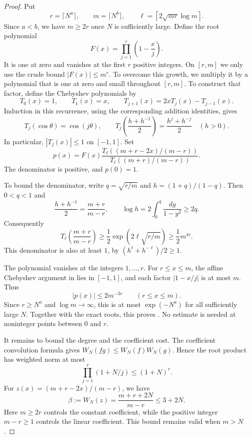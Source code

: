 \begin{proof}
Put
\[
  r=\lceil N^a\rceil,
  \qquad m=\lceil N^b\rceil,
  \qquad \ell=\left\lceil 2\sqrt{mr}\log m\right\rceil.
\]
Since $a<b$, we have $m\ge2r$ once $N$ is sufficiently large.  Define the
root polynomial
\[
 F(x)=\prod_{j=1}^{r}\left(1-\frac{x}{j}\right).
\]
It is one at zero and vanishes at the first $r$ positive integers.
On $[r,m]$ we only use the crude bound $|F(x)|\le m^r$.
To overcome this growth, we multiply it by a
polynomial that is one at zero and small throughout $[r,m]$.
To construct that factor, define the
Chebyshev polynomials by
\[
  T_0(x)=1,\qquad T_1(x)=x,\qquad
  T_{j+1}(x)=2xT_j(x)-T_{j-1}(x).
\]
Induction in this recurrence, using the corresponding addition identities,
gives
\[
  T_j(\cos\theta)=\cos(j\theta),
  \qquad
  T_j\!\left(\frac{h+h^{-1}}2\right)
    =\frac{h^j+h^{-j}}2\quad(h>0).
\]
In particular, $|T_j(x)|\le1$ on $[-1,1]$.  Set
\begin{equation}\label{eq:polynomial-construction}
  p(x)=F(x)
       \frac{T_\ell\!\left((m+r-2x)/(m-r)\right)}
            {T_\ell\!\left((m+r)/(m-r)\right)}.
\end{equation}
The denominator is positive, and $p(0)=1$.

To bound the denominator, write $q=\sqrt{r/m}$ and
$h=(1+q)/(1-q)$.  Then $0<q<1$ and
\[
  \frac{h+h^{-1}}2=\frac{m+r}{m-r},
  \qquad
  \log h=2\int_0^q\frac{dy}{1-y^2}\ge2q.
\]
Consequently
\[
  T_\ell\!\left(\frac{m+r}{m-r}\right)
    \ge \frac12\exp\!\left(2\ell\sqrt{r/m}\right)
    \ge \frac12 m^{4r}.
\]
This denominator is also at least $1$, by
$(h^\ell+h^{-\ell})/2\ge1$.

The polynomial vanishes at the integers $1,\ldots,r$.  For $r\le x\le m$,
the affine Chebyshev argument in  lies in
$[-1,1]$, and each factor $|1-x/j|$ is at most $m$.  Thus
\[
  |p(x)|\le 2m^{-3r}\qquad(r\le x\le m).
\]
Since $r\ge N^a$ and $\log m\longrightarrow\infty$, this is at most
$\exp(-N^a)$ for all sufficiently large $N$.  Together with the exact roots,
this proves .  No estimate is needed at noninteger
points between $0$ and $r$.

It remains to bound the degree and the coefficient cost.
The coefficient convolution formula gives
$W_N(fg)\le W_N(f)W_N(g)$.  Hence the root product has weighted norm at most
\[
  \prod_{j=1}^r(1+N/j)\le(1+N)^r.
\]
For $z(x)=(m+r-2x)/(m-r)$, we have
\[
  \beta:=W_N(z)=\frac{m+r+2N}{m-r}\le3+2N.
\]
Here $m\ge2r$ controls the constant coefficient, while the positive integer
$m-r\ge1$ controls the linear coefficient.  This bound remains valid when
$m>N$.


\end{proof}
